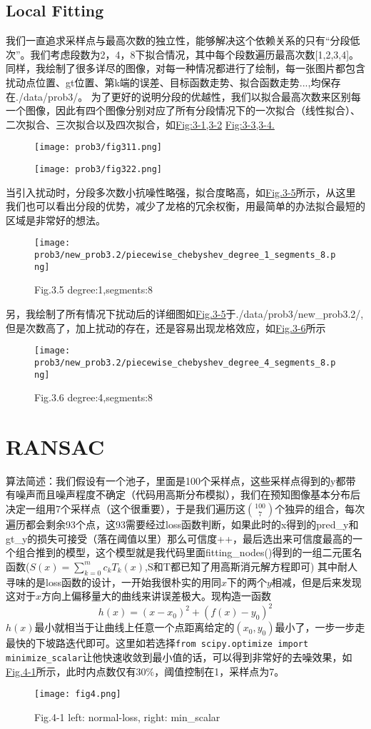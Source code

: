 \documentclass{article}
\begin{document}
\subsection{Local Fitting}
我们一直追求采样点与最高次数的独立性，能够解决这个依赖关系的只有“分段低次”。我们考虑段数为2，4，8下拟合情况，其中每个段数遍历最高次数[1,2,3,4]。同样，我绘制了很多详尽的图像，对每一种情况都进行了绘制，每一张图片都包含扰动点位置、gt位置、第k端的误差、目标函数走势、拟合函数走势...,均保存在./data/prob3/。
为了更好的说明分段的优越性，我们以拟合最高次数来区别每一个图像，因此有四个图像分别对应了所有分段情况下的一次拟合（线性拟合）、二次拟合、三次拟合以及四次拟合，如\hyperref[fig:3-1,3-2]{Fig:3-1,3-2} \hyperref[fig:3-3,3-4]{Fig:3-3,3-4.}
\begin{figure}[H]
    \centering
    \texttt{[image: prob3/fig311.png]}
    \label{fig:3-1,3-2}
\end{figure}
\begin{figure}[H]
    \centering
    \texttt{[image: prob3/fig322.png]}
    \label{fig:3-3,3-4}
\end{figure}
\clearpage
当引入扰动时，分段多次数小抗噪性略强，拟合度略高，如\hyperref[fig:3-5]{Fig.3-5}所示，从这里我们也可以看出分段的优势，减少了龙格的冗余权衡，用最简单的办法拟合最短的区域是非常好的想法。
\begin{figure}[H]
    \centering
    \texttt{[image: prob3/new\_prob3.2/piecewise\_chebyshev\_degree\_1\_segments\_8.png]}
    \caption*{Fig.3.5 degree:1,segments:8}
    \label{fig:3-5}
\end{figure}
另，我绘制了所有情况下扰动后的详细图如\hyperref[fig:3-5]{Fig.3-5}于./data/prob3/new\_prob3.2/,但是次数高了，加上扰动的存在，还是容易出现龙格效应，如\hyperref[fig:3-6]{Fig.3-6}所示
\begin{figure}[H]
    \centering
    \texttt{[image: prob3/new\_prob3.2/piecewise\_chebyshev\_degree\_4\_segments\_8.png]}
    \caption*{Fig.3.6 degree:4,segments:8}
    \label{fig:3-6}
\end{figure}
\section{RANSAC}
算法简述：我们假设有一个池子，里面是100个采样点，这些采样点得到的y都带有噪声而且噪声程度不确定（代码用高斯分布模拟），我们在预知图像基本分布后决定一组用7个采样点（这个很重要），于是我们遍历这$\binom{100}{7}$个独异的组合，每次遍历都会剩余93个点，这93需要经过loss函数判断，如果此时的x得到的pred\_y和gt\_y的损失可接受（落在阈值以里）那么可信度++，最后选出来可信度最高的一个组合推到的模型，这个模型就是我代码里面fitting\_nodes()得到的一组二元匿名函数($S(x) = \sum_{k=0}^{m} c_k T_k(x)$,S和T都已知了用高斯消元解方程即可)
其中耐人寻味的是loss函数的设计，一开始我很朴实的用同$x$下的两个$y$相减，但是后来发现这对于$x$方向上偏移量大的曲线来讲误差极大。现构造一函数
\[
h(x) = (x - x_0)^2 + (f(x) - y_0)^2
\]
$h(x)$最小就相当于让曲线上任意一个点距离给定的$(x_0, y_0)$最小了，一步一步走最快的下坡路迭代即可。这里如若选择\texttt{from scipy.optimize import minimize\_scalar}让他快速收敛到最小值的话，可以得到非常好的去噪效果，如\hyperref[fig:4-1]{Fig.4-1}所示，此时内点数仅有30$\%$，阈值控制在1，采样点为7。

\begin{figure}[H]
    \centering
    \texttt{[image: fig4.png]}
    \caption*{Fig.4-1 left: normal-loss, right: min\_scalar}
    \label{fig:4-1}
\end{figure}
\end{document}
